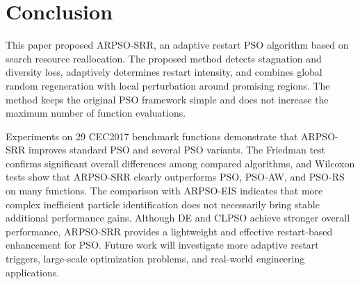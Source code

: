 \documentclass[conference]{IEEEtran}
\begin{document}
\section{Conclusion}\label{sec:conclusion}
This paper proposed ARPSO-SRR, an adaptive restart PSO algorithm based on search resource reallocation. The proposed method detects stagnation and diversity loss, adaptively determines restart intensity, and combines global random regeneration with local perturbation around promising regions. The method keeps the original PSO framework simple and does not increase the maximum number of function evaluations.

Experiments on 29 CEC2017 benchmark functions demonstrate that ARPSO-SRR improves standard PSO and several PSO variants. The Friedman test confirms significant overall differences among compared algorithms, and Wilcoxon tests show that ARPSO-SRR clearly outperforms PSO, PSO-AW, and PSO-RS on many functions. The comparison with ARPSO-EIS indicates that more complex inefficient particle identification does not necessarily bring stable additional performance gains. Although DE and CLPSO achieve stronger overall performance, ARPSO-SRR provides a lightweight and effective restart-based enhancement for PSO. Future work will investigate more adaptive restart triggers, large-scale optimization problems, and real-world engineering applications.
\end{document}
